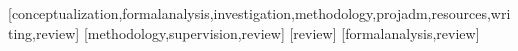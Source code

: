 \documentclass[portuguese]{textolivre}
\begin{document}
\begin{contributors}
[conceptualization,formalanalysis,investigation,methodology,projadm,resources,writing,review]
[methodology,supervision,review]
[review]
[formalanalysis,review]
\end{contributors}
\end{document}

